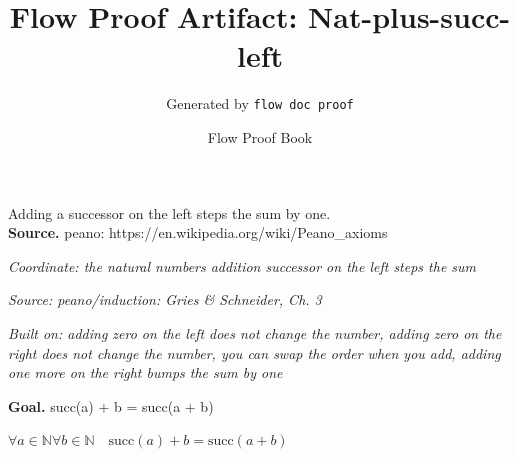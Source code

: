 \documentclass[11pt]{article}
\title{Flow Proof Artifact: Nat-plus-succ-left}
\author{Generated by \texttt{flow doc proof}}
\date{Flow Proof Book}
\theoremstyle{definition}
\begin{document}
\maketitle
Adding a successor on the left steps the sum by one.\\[0.5em]
\textbf{Source.} peano: https://en.wikipedia.org/wiki/Peano\_axioms\\[0.5em]
\bigskip
{}\par
\smallskip\noindent\textit{Coordinate: the natural numbers \cdot addition \cdot successor on the left steps the sum}\par
\smallskip\noindent\textit{Source: peano/induction: Gries \& Schneider, Ch. 3}\par
\smallskip\noindent\textit{Built on: adding zero on the left does not change the number, adding zero on the right does not change the number, you can swap the order when you add, adding one more on the right bumps the sum by one}\par
\medskip
\noindent\textbf{Goal.} succ(a) + b = succ(a + b)\par
\noindent$\displaystyle \forall a \in \mathbb{N} \forall b \in \mathbb{N}\quad \mathrm{succ}(a) + b = \mathrm{succ}(a + b)$\par
\medskip
\noindent
\end{document}
